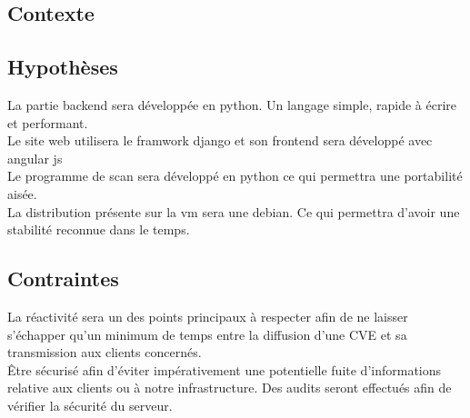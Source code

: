 \textcolor{myBlue}{\chapter{Contexte}}
\section{Hypothèses}
La partie backend sera développée en python. Un langage simple, rapide à écrire et performant.\\
Le site web utilisera le framwork django et son frontend sera développé avec angular js\\
Le programme de scan sera développé en python ce qui permettra une portabilité aisée.\\
La distribution présente sur la vm sera une debian. Ce qui permettra d’avoir une stabilité reconnue dans le temps.\\

\section{Contraintes}
La réactivité sera un des points principaux à respecter afin de ne laisser s’échapper qu’un minimum de temps entre la diffusion d’une CVE et sa transmission aux clients concernés.\\
Être sécurisé afin d’éviter impérativement une potentielle fuite d’informations relative aux clients ou à notre infrastructure. Des audits seront effectués afin de vérifier la sécurité du serveur.\\
